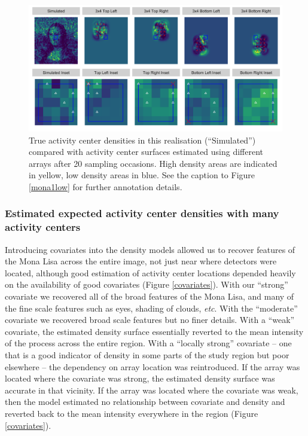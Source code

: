 \documentclass[a4paper,12pt]{article}
\begin{document}
\begin{figure}[htbp]
\centering
\includegraphics[width=1\textwidth]{many_faces_mona_higheffort.png}
\caption{True activity center densities in this realisation (``Simulated'') compared with activity center surfaces estimated using different arrays after 20 sampling occasions. High density areas are indicated in yellow, low density areas in blue. See the caption to Figure \ref{mona1low} for further annotation details.}
\label{mona1hi}
\end{figure}

\subsubsection{Estimated expected activity center densities with many activity centers}

Introducing covariates into the density models allowed us to recover features of the Mona Lisa across the entire image, not just near where detectors were located, although good estimation of activity center locations depended heavily on the availability of good covariates (Figure \ref{covariates}). With our ``strong'' covariate we recovered all of the broad features of the Mona Lisa, and many of the fine scale features such as eyes, shading of clouds, {\it etc}. With the ``moderate'' covariate we recovered broad scale features but no finer details. With a ``weak'' covariate, the estimated density surface essentially reverted to the mean intensity of the process across the entire region. With a ``locally strong'' covariate -- one that is a good indicator of density in some parts of the study region but poor elsewhere -- the dependency on array location was reintroduced. If the array was located where the covariate was strong, the estimated density surface was accurate in that vicinity. If the array was located where the covariate was weak, then the model estimated no relationship between covariate and density and reverted back to the mean intensity everywhere in the region (Figure \ref{covariates}). 
\end{document}
